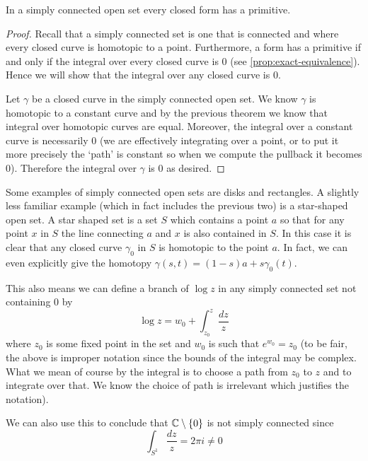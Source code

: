 \begin{corollary}
    In a simply connected open set every closed form has a primitive.
\end{corollary}
\begin{proof}
    Recall that a simply connected set is one that is connected and where every closed curve is homotopic to a point. Furthermore, a form has a primitive if and only if the integral over every closed curve is 0 (see \autoref{prop:exact-equivalence}). Hence we will show that the integral over any closed curve is 0. 
    
    Let $\gamma$ be a closed curve in the simply connected open set. We know $\gamma$ is homotopic to a constant curve and by the previous theorem we know that integral over homotopic curves are equal. Moreover, the integral over a constant curve is necessarily 0 (we are effectively integrating over a point, or to put it more precisely the `path' is constant so when we compute the pullback it becomes 0). Therefore the integral over $\gamma$ is 0 as desired. 
\end{proof}

Some examples of simply connected open sets are disks and rectangles. A slightly less familiar example (which in fact includes the previous two) is a star-shaped open set. A star shaped set is a set $S$ which contains a point $a$ so that for any point $x$ in $S$ the line connecting $a$ and $x$ is also contained in $S$. In this case it is clear that any closed curve $\gamma_0$ in $S$ is homotopic to the point $a$. In fact, we can even explicitly give the homotopy $\gamma(s, t) = (1 - s)a + s\gamma_0(t)$.

This also means we can define a branch of $\log z$ in any simply connected set not containing 0 by
$$ \log z = w_0 + \int_{z_0}^z \frac{dz}{z} $$
where $z_0$ is some fixed point in the set and $w_0$ is such that $e^{w_0} = z_0$ (to be fair, the above is improper notation since the bounds of the integral may be complex. What we mean of course by the integral is to choose a path from $z_0$ to $z$ and to integrate over that. We know the choice of path is irrelevant which justifies the notation). 

We can also use this to conclude that $\mathbb{C} \setminus \{0\}$ is not simply connected since 
$$ \int_{S^1} \frac{dz}{z} = 2\pi i \neq 0 $$

